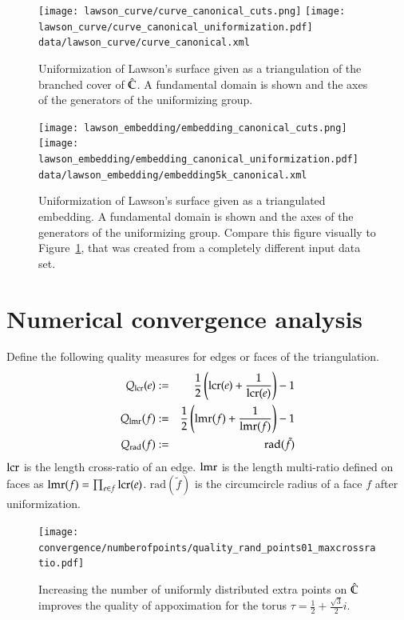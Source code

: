 \documentclass[Thesis.tex]{subfiles}
\begin{document}
\begin{figure}
\centering
\texttt{[image: lawson\_curve/curve\_canonical\_cuts.png]}
\texttt{[image: lawson\_curve/curve\_canonical\_uniformization.pdf]}
{\scriptsize\tt data/lawson\_curve/curve\_canonical.xml}
\caption{Uniformization of Lawson's surface given as a triangulation of the
branched cover of $\hat{\mathbb C}$. A fundamental domain is shown and the axes of the
generators of the uniformizing group.} 
\label{fig:lawson_curve_canonical}
\end{figure}


\begin{figure} 
\centering
\texttt{[image: lawson\_embedding/embedding\_canonical\_cuts.png]}
\texttt{[image: lawson\_embedding/embedding\_canonical\_uniformization.pdf]}
{\scriptsize\tt data/lawson\_embedding/embedding5k\_canonical.xml}
\caption{Uniformization of Lawson's surface given as a triangulated embedding.
A fundamental domain is shown and the axes of the generators of the
uniformizing group. Compare this figure visually to
Figure~\ref{fig:lawson_curve_canonical}, that was created from a completely
different input data set.} 
\label{fig:lawson_embedding_canonical}
\end{figure}


\section{Numerical convergence analysis}

Define the following quality measures for edges or faces of the triangulation.
\begin{eqnarray}
	Q_{\operatorname{lcr}}(e) &:=& \frac{1}{2}\left(\operatorname{lcr}(e) + \frac{1}{\operatorname{lcr}(e)}\right) - 1\label{eq:quality_lcr}\\
	Q_{\operatorname{lmr}}(f) &:=& \frac{1}{2}\left(\operatorname{lmr}(f) + \frac{1}{\operatorname{lmr}(f)}\right) - 1\label{eq:quality_lmr}\\
	Q_{\mathrm{rad}}(f) &:=& \mathrm{rad}(\tilde{f})\label{eq:quality_rad}
\end{eqnarray}
$\operatorname{lcr}$ is the length cross-ratio of an edge. $\operatorname{lmr}$ is the length multi-ratio defined on faces as $\operatorname{lmr}(f)=\prod_{e \in f}\operatorname{lcr}(e)$. $\mathrm{rad}(\tilde{f})$ is the circumcircle radius of a face $f$ after uniformization.

\begin{figure}[h]
\centering
\texttt{[image: convergence/numberofpoints/quality\_rand\_points01\_maxcrossratio.pdf]}
\caption{Increasing the number of uniformly distributed extra points on $\hat{\mathbb C}$ improves the quality of appoximation for the torus $\tau=\frac{1}{2}+\frac{\sqrt 3}{2}i$.}
\label{fig:convergence_random}
\end{figure}
\end{document}
